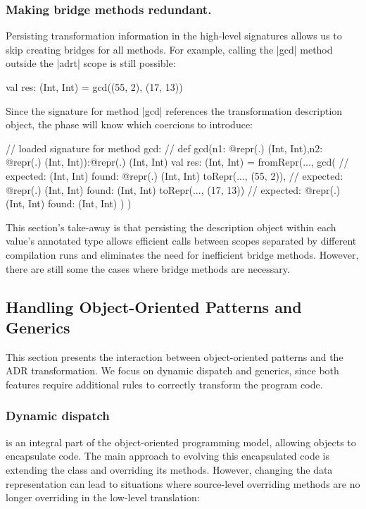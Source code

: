 \subsubsection{Making bridge methods redundant.} Persisting transformation information in the high-level signatures allows us to skip creating bridges for all methods. For example, calling the |gcd| method outside the |adrt| scope is still possible:

\begin{lstlisting-nobreak}
val res: (Int, Int) = gcd((55, 2), (17, 13))
\end{lstlisting-nobreak}

Since the signature for method |gcd| references the transformation description object, the \coerce{} phase will know which coercions to introduce:

\begin{lstlisting-nobreak}
// loaded signature for method gcd:
// def gcd(n1: @repr(.) (Int, Int),n2: @repr(.) (Int, Int)):@repr(.) (Int, Int)
val res: (Int, Int) =
  fromRepr(...,
    gcd(                           // expected: (Int, Int) found: @repr(.) (Int, Int)
      toRepr(..., (55, 2)),   // expected: @repr(.) (Int, Int) found: (Int, Int)
      toRepr(..., (17, 13))  // expected: @repr(.) (Int, Int) found: (Int, Int)
    )
  )
\end{lstlisting-nobreak}

This section's take-away is that persisting the description object within each value's annotated type allows efficient calls between scopes separated by different compilation runs and eliminates the need for inefficient bridge methods. However, there are still some the cases where bridge methods are necessary.


\subsection{Handling Object-Oriented Patterns and Generics}
\label{sec:ildl:generics}

This section presents the interaction between object-oriented patterns and the ADR transformation. We focus on dynamic dispatch and generics, since both features require additional rules to correctly transform the program code.

\subsubsection{Dynamic dispatch}
is an integral part of the object-oriented programming model, allowing objects to encapsulate code. The main approach to evolving this encapsulated code is extending the class and overriding its methods. However, changing the data representation can lead to situations where source-level overriding methods are no longer overriding in the low-level translation:


